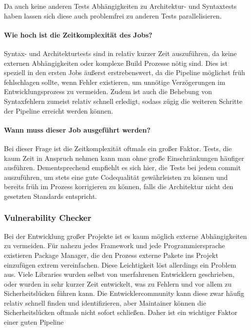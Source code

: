 Da auch keine anderen Tests Abhängigkeiten zu Architektur- und Syntaxtests haben lassen sich diese auch problemfrei zu anderen Tests parallelisieren.

\paragraph{Wie hoch ist die Zeitkomplexität des Jobs?}

Syntax- und Architekturtests sind in relativ kurzer Zeit auszuführen, da keine externen Abhängigkeiten oder komplexe Build Prozesse nötig sind.
Dies ist speziell in den ersten Jobs äußerst erstrebenswert, da die Pipeline möglichst früh fehlschlagen sollte, wenn Fehler existieren, um unnötige Verzögerungen im Entwicklungsprozess zu vermeiden.
Zudem ist auch die Behebung von Syntaxfehlern zumeist relativ schnell erledigt, sodass zügig die weiteren Schritte der Pipeline erreicht werden können.

\paragraph{Wann muss dieser Job ausgeführt werden?}

Bei dieser Frage ist die Zeitkomplexität oftmals ein großer Faktor.
Tests, die kaum Zeit in Anspruch nehmen kann man ohne große Einschränkungen häufiger ausführen.
Dementsprechend empfiehlt es sich hier, die Tests bei jedem commit auszuführen, um stets eine gute Codequalität gewährleisten zu können und bereits früh im Prozess korrigieren zu können, falls die Architektur nicht den gesetzten Standards entspricht.

\subsubsection{Vulnerability Checker}

Bei der Entwicklung großer Projekte ist es kaum möglich externe Abhängigkeiten zu vermeiden.
Für nahezu jedes Framework und jede Programmiersprache existieren Package Manager, die den Prozess externe Pakete ins Projekt einzufügen extrem vereinfachen.
Diese Leichtigkeit löst allerdings ein Problem aus.
Viele Libraries wurden selbst von unerfahrenen Entwicklern geschrieben, oder wurden in sehr kurzer Zeit entwickelt, was zu Fehlern und vor allem zu Sicherheitslücken führen kann.
Die Entwicklercommunity kann diese zwar häufig relativ schnell finden und identifizieren, aber Maintainer können die Sicherheitslücken oftmals nicht sofort schließen.
Daher ist ein wichtiger Faktor einer guten Pipeline

